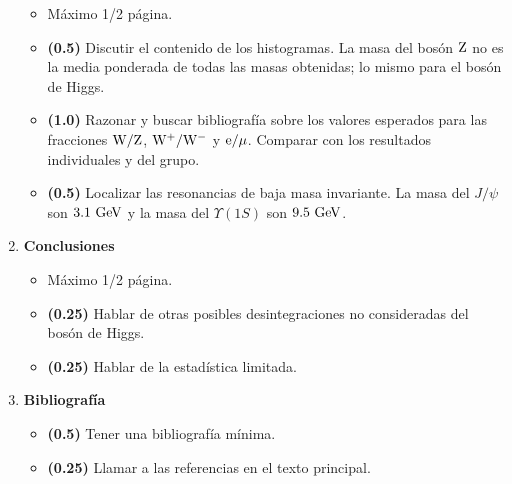 \documentclass[11pt]{articulo}
\begin{document}
\begin{enumerate}
\begin{itemize}

\item M\'aximo 1/2 p\'agina.

\item {\bf (0.5)} Discutir el contenido de los histogramas. La masa del bos\'on ${\rm Z}$ no es la media ponderada de todas las masas obtenidas; lo mismo para el bos\'on de Higgs.

\item {\bf (1.0)} Razonar y buscar bibliograf\'ia sobre los valores esperados para las fracciones ${\rm W/Z}$, ${\rm W^+/W^-}$ y ${\rm e/\mu}$. Comparar con los resultados individuales y del grupo.

\item {\bf (0.5)} Localizar las resonancias de baja masa invariante. La masa del $J/\psi$ son ${\rm 3.1~GeV}$ y la masa del $\Upsilon(1S)$ son ${\rm 9.5~GeV}$.

\end{itemize}

\item {\bf Conclusiones}

\begin{itemize}

\item M\'aximo 1/2 p\'agina.

\item {\bf (0.25)} Hablar de otras posibles desintegraciones no consideradas del bos\'on de Higgs.

\item {\bf (0.25)} Hablar de la estad\'istica limitada.

\end{itemize}

\item {\bf Bibliograf\'ia}

\begin{itemize}

\item {\bf (0.5)} Tener una bibliograf\'ia m\'inima.

\item {\bf (0.25)} Llamar a las referencias en el texto principal.

\end{itemize}

\end{enumerate}
\end{document}
